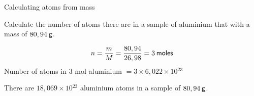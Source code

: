     \noindent
\label{m38717*secfhsst!!!underscore!!!id494}\vspace{.5cm} 
      \noindent
      \begin{wex}{Calculating atoms from mass }{
\label{m38717*probfhsst!!!underscore!!!id495}
      \label{m38717*id277914}Calculate the number of atoms there are in a sample of aluminium that with a mass of $80,94\phantom{\rule{2pt}{0ex}}\mathsf{g}$.\par 
      \vspace{5pt}}
{
      \label{m38717*id277959}\nopagebreak\noindent{}
        
    \begin{equation*}
    n=\frac{m}{M}=\frac{80,94}{26,98}=3\phantom{\rule{2pt}{0ex}}\mathsf{moles}
      \end{equation*}
      \label{m38717*id278019}Number of atoms in 3 mol aluminium $=3\ensuremath{\times}6,022\ensuremath{\times}10{}^{23}$\par 
      \label{m38717*id278053}There are $18,069\ensuremath{\times}10{}^{23}$ aluminium atoms in a sample of $80,94\phantom{\rule{2pt}{0ex}}\mathsf{g}$.\par 
}
    \end{wex}
    \noindent
\label{m38717*secfhsst!!!underscore!!!id539}
